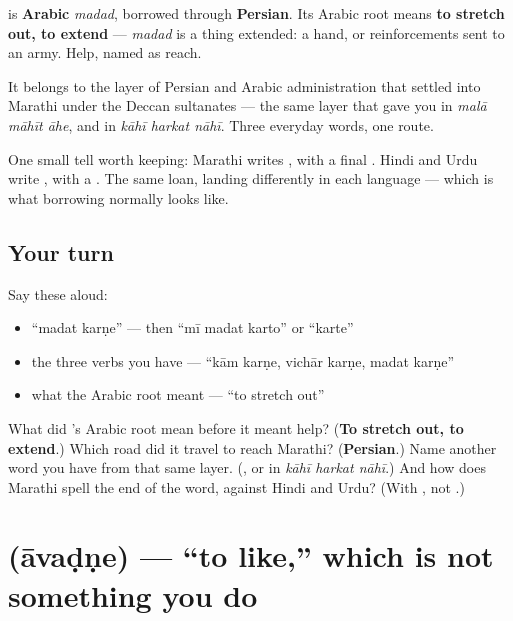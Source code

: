 \begin{cousinweb}
\textbf{} is \textbf{Arabic} \emph{madad}, borrowed through \textbf{Persian}. Its Arabic root means \textbf{to stretch out, to extend} — \emph{madad} is a thing extended: a hand, or reinforcements sent to an army. Help, named as reach.

It belongs to the layer of Persian and Arabic administration that settled into Marathi under the Deccan sultanates — the same layer that gave you \textbf{} in \emph{malā māhīt āhe}, and \textbf{} in \emph{kāhī harkat nāhī}. Three everyday words, one route.

One small tell worth keeping: Marathi writes \textbf{}, with a final \textbf{}. Hindi and Urdu write \textbf{}, with a \textbf{}. The same loan, landing differently in each language — which is what borrowing normally looks like.
\end{cousinweb}

\subsection*{Your turn}
Say these aloud:

\begin{itemize}
\raggedright
  \item \textquotedblleft{}madat karṇe\textquotedblright{} — then \textquotedblleft{}mī madat karto\textquotedblright{} or \textquotedblleft{}karte\textquotedblright{}
  \item the three  verbs you have — \textquotedblleft{}kām karṇe, vichār karṇe, madat karṇe\textquotedblright{}
  \item what the Arabic root meant — \textquotedblleft{}to stretch out\textquotedblright{}
\end{itemize}

\begin{tcolorbox}[breakable,colback=teal!4,colframe=teal!35!black,title={Before you move on}]
What did \textbf{}'s Arabic root mean before it meant help? (\textbf{To stretch out, to extend}.) Which road did it travel to reach Marathi? (\textbf{Persian}.) Name another word you have from that same layer. (\textbf{}, or \textbf{} in \emph{kāhī harkat nāhī}.) And how does Marathi spell the end of the word, against Hindi and Urdu? (With \textbf{}, not \textbf{}.)
\end{tcolorbox}
\section[āvaḍṇe]{ (āvaḍṇe) — \textquotedblleft{}to like,\textquotedblright{} which is not something you do}

